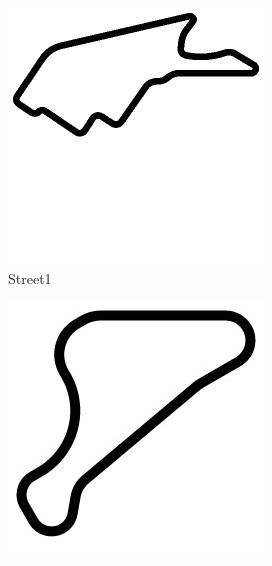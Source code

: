 \begin{figure}
\centering
\begin{subfigure}[b]{0.2\textwidth}
       \includegraphics[width=\textwidth]{img/tracks/Street1}
       \caption{Street1}
   \end{subfigure}
\begin{subfigure}[b]{0.2\textwidth}
       \includegraphics[width=\textwidth]{img/tracks/CG-Speedway}

\end{subfigure}
\end{figure}
